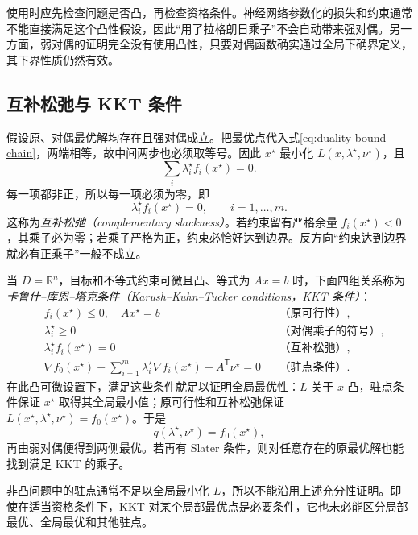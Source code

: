 \documentclass[UTF8,12pt,a4paper,fontset=fandol]{ctexart}
\begin{document}
使用时应先检查问题是否凸，再检查资格条件。神经网络参数化的损失和约束通常不能直接满足这个凸性假设，因此“用了拉格朗日乘子”不会自动带来强对偶。另一方面，弱对偶的证明完全没有使用凸性，只要对偶函数确实通过全局下确界定义，其下界性质仍然有效。

\subsection{互补松弛与 KKT 条件}

假设原、对偶最优解均存在且强对偶成立。把最优点代入式\eqref{eq:duality-bound-chain}，两端相等，故中间两步也必须取等号。因此 $x^\star$ 最小化 $L(x,\lambda^\star,\nu^\star)$，且
\[
 \sum_i\lambda_i^\star f_i(x^\star)=0.
\]
每一项都非正，所以每一项必须为零，即
\begin{equation}
 \lambda_i^\star f_i(x^\star)=0,\qquad i=1,\ldots,m.
 \label{eq:duality-complementarity}
\end{equation}
这称为\emph{互补松弛（complementary slackness）}。若约束留有严格余量 $f_i(x^\star)<0$，其乘子必为零；若乘子严格为正，约束必恰好达到边界。反方向“约束达到边界就必有正乘子”一般不成立。

当 $D=\mathbb R^n$，目标和不等式约束可微且凸、等式为 $Ax=b$ 时，下面四组关系称为\emph{卡鲁什--库恩--塔克条件（Karush--Kuhn--Tucker conditions，KKT 条件）}：
\begin{equation}
 \begin{aligned}
 &f_i(x^\star)\leq0,\quad Ax^\star=b
 &&\text{（原可行性）},\\
 &\lambda_i^\star\geq0
 &&\text{（对偶乘子的符号）},\\
 &\lambda_i^\star f_i(x^\star)=0
 &&\text{（互补松弛）},\\
 &\nabla f_0(x^\star)+\sum_{i=1}^m\lambda_i^\star\nabla f_i(x^\star)
       +A^{\mathsf T}\nu^\star=0
 &&\text{（驻点条件）}.
 \end{aligned}
 \label{eq:duality-kkt}
\end{equation}
在此凸可微设置下，满足这些条件就足以证明全局最优性：$L$ 关于 $x$ 凸，驻点条件保证 $x^\star$ 取得其全局最小值；原可行性和互补松弛保证 $L(x^\star,\lambda^\star,\nu^\star)=f_0(x^\star)$。于是
\[
 q(\lambda^\star,\nu^\star)=f_0(x^\star),
\]
再由弱对偶便得到两侧最优。若再有 Slater 条件，则对任意存在的原最优解也能找到满足 KKT 的乘子。

非凸问题中的驻点通常不足以全局最小化 $L$，所以不能沿用上述充分性证明。即使在适当资格条件下，KKT 对某个局部最优点是必要条件，它也未必能区分局部最优、全局最优和其他驻点。
\end{document}
